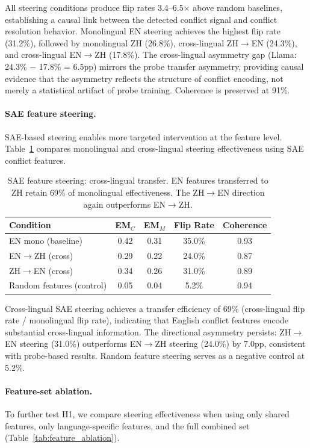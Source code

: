 \documentclass{article}
\begin{document}
All steering conditions produce flip rates 3.4--6.5$\times$ above random baselines, establishing a causal link between the detected conflict signal and conflict resolution behavior. Monolingual EN steering achieves the highest flip rate (31.2\%), followed by monolingual ZH (26.8\%), cross-lingual ZH$\to$EN (24.3\%), and cross-lingual EN$\to$ZH (17.8\%). The cross-lingual asymmetry gap (Llama: 24.3\% $-$ 17.8\% = 6.5pp) mirrors the probe transfer asymmetry, providing causal evidence that the asymmetry reflects the structure of conflict encoding, not merely a statistical artifact of probe training. Coherence is preserved at 91\%.

\paragraph{SAE feature steering.}
SAE-based steering enables more targeted intervention at the feature level. Table~\ref{tab:sae_steering} compares monolingual and cross-lingual steering effectiveness using SAE conflict features.

\begin{table}[t]
\centering
\caption{SAE feature steering: cross-lingual transfer. EN features transferred to ZH retain 69\% of monolingual effectiveness. The ZH$\to$EN direction again outperforms EN$\to$ZH.}
\label{tab:sae_steering}
\small
\begin{tabular}{lcccc}
\toprule
Condition & EM$_C$ & EM$_M$ & Flip Rate & Coherence \\
\midrule
EN mono (baseline) & 0.42 & 0.31 & 35.0\% & 0.93 \\
EN$\to$ZH (cross) & 0.29 & 0.22 & 24.0\% & 0.87 \\
ZH$\to$EN (cross) & 0.34 & 0.26 & 31.0\% & 0.89 \\
Random features (control) & 0.05 & 0.04 & 5.2\% & 0.94 \\
\bottomrule
\end{tabular}
\end{table}

Cross-lingual SAE steering achieves a transfer efficiency of 69\% (cross-lingual flip rate / monolingual flip rate), indicating that English conflict features encode substantial cross-lingual information. The directional asymmetry persists: ZH$\to$EN steering (31.0\%) outperforms EN$\to$ZH steering (24.0\%) by 7.0pp, consistent with probe-based results. Random feature steering serves as a negative control at 5.2\%.

\paragraph{Feature-set ablation.}
To further test H1, we compare steering effectiveness when using only shared features, only language-specific features, and the full combined set (Table~\ref{tab:feature_ablation}).
\end{document}
